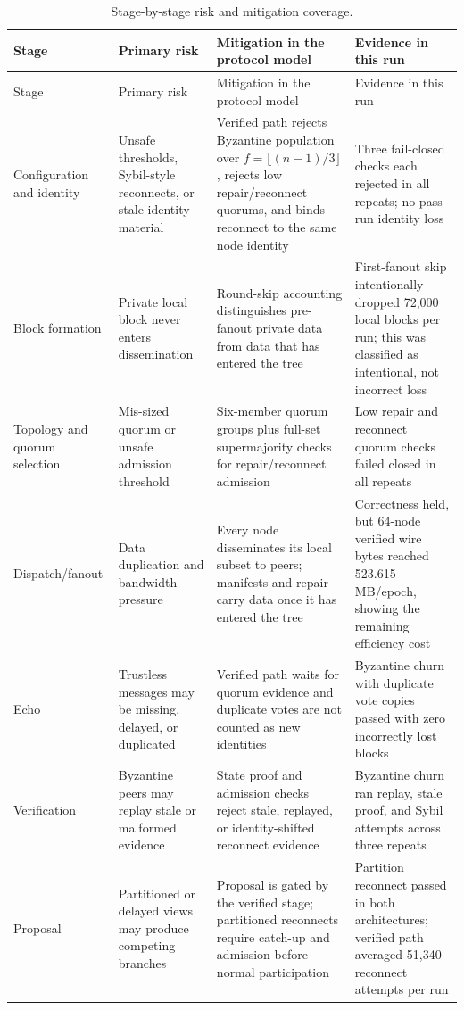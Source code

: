 \documentclass[11pt]{article}
\begin{document}
\begin{longtable}{p{}p{}p{}p{}}
\caption{Stage-by-stage risk and mitigation coverage.}\\
\toprule
Stage & Primary risk & Mitigation in the protocol model & Evidence in this run \\
\midrule
\endfirsthead
\toprule
Stage & Primary risk & Mitigation in the protocol model & Evidence in this run \\
\midrule
\endhead
Configuration and identity & Unsafe thresholds, Sybil-style reconnects, or stale identity material & Verified path rejects Byzantine population over \(f=\lfloor(n-1)/3\rfloor\), rejects low repair/reconnect quorums, and binds reconnect to the same node identity & Three fail-closed checks each rejected in all repeats; no pass-run identity loss \\
Block formation & Private local block never enters dissemination & Round-skip accounting distinguishes pre-fanout private data from data that has entered the tree & First-fanout skip intentionally dropped 72,000 local blocks per run; this was classified as intentional, not incorrect loss \\
Topology and quorum selection & Mis-sized quorum or unsafe admission threshold & Six-member quorum groups plus full-set supermajority checks for repair/reconnect admission & Low repair and reconnect quorum checks failed closed in all repeats \\
Dispatch/fanout & Data duplication and bandwidth pressure & Every node disseminates its local subset to peers; manifests and repair carry data once it has entered the tree & Correctness held, but 64-node verified wire bytes reached 523.615 MB/epoch, showing the remaining efficiency cost \\
Echo & Trustless messages may be missing, delayed, or duplicated & Verified path waits for quorum evidence and duplicate votes are not counted as new identities & Byzantine churn with duplicate vote copies passed with zero incorrectly lost blocks \\
Verification & Byzantine peers may replay stale or malformed evidence & State proof and admission checks reject stale, replayed, or identity-shifted reconnect evidence & Byzantine churn ran replay, stale proof, and Sybil attempts across three repeats \\
Proposal & Partitioned or delayed views may produce competing branches & Proposal is gated by the verified stage; partitioned reconnects require catch-up and admission before normal participation & Partition reconnect passed in both architectures; verified path averaged 51,340 reconnect attempts per run \\

\end{longtable}
\end{document}
